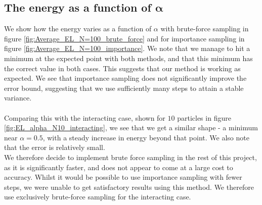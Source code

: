 \documentclass[a4paper, 10pt]{article}
\begin{document}
	\subsection{The energy as a function of $\boldsymbol{\alpha}$}\label{sec:Disc_energy_as_a_function_of_alpha}
	We show how the energy varies as a function of $\alpha$ with brute-force sampling in figure \ref{fig:Average_EL_N=100_brute_force} and for importance sampling in figure \ref{fig:Average_EL_N=100_importance}. We note that we manage to hit a minimum at the expected point with both methods, and that this minimum has the correct value in both cases. This suggests that our method is working as expected. We see that importance sampling does not significantly improve the error bound, suggesting that we use sufficiently many steps to attain a stable variance.\\\\
	\linebreak
	 Comparing this with the interacting case, shown for $10$ particles in figure \ref{fig:EL_alpha_N10_interacting}, we see that we get a similar shape - a minimum near $\alpha=0.5$, with a steady increase in energy beyond that point. We also note that the error is relatively small.\\
	 \linebreak
	 We therefore decide to implement brute force sampling in the rest of this project, as it is significantly faster, and does not appear to come at a large cost to accuracy. Whilst it would be possible to use importance sampling with fewer steps, we were unable to get satisfactory results using this method. We therefore use exclusively brute-force sampling for the interacting case.
\end{document}
